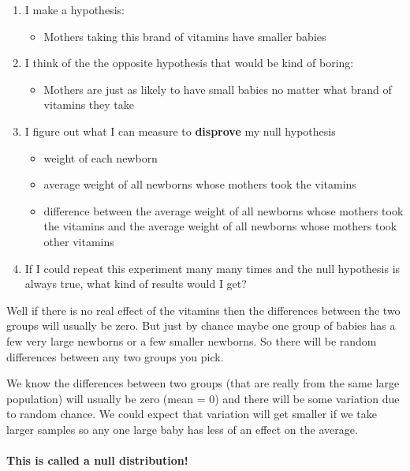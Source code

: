 \documentclass[]{article}
\providecommand{\tightlist}{%
  \setlength{\itemsep}{0pt}\setlength{\parskip}{0pt}}
\let\oldparagraph\paragraph
\renewcommand{\paragraph}[1]{\oldparagraph{#1}\mbox{}}
\begin{document}
\begin{enumerate}
\def\labelenumi{\arabic{enumi}.}
\tightlist
\item
  I make a hypothesis:

  \begin{itemize}
  \tightlist
  \item
    Mothers taking this brand of vitamins have smaller babies
  \end{itemize}
\item
  I think of the the opposite hypothesis that would be kind of boring:

  \begin{itemize}
  \tightlist
  \item
    Mothers are just as likely to have small babies no matter what brand
    of vitamins they take
  \end{itemize}
\item
  I figure out what I can measure to \textbf{disprove} my null
  hypothesis

  \begin{itemize}
  \tightlist
  \item
    weight of each newborn
  \item
    average weight of all newborns whose mothers took the vitamins
  \item
    difference between the average weight of all newborns whose mothers
    took the vitamins and the average weight of all newborns whose
    mothers took other vitamins
  \end{itemize}
\item
  If I could repeat this experiment many many times and the null
  hypothesis is always true, what kind of results would I get?
\end{enumerate}

Well if there is no real effect of the vitamins then the differences
between the two groups will usually be zero. But just by chance maybe
one group of babies has a few very large newborns or a few smaller
newborns. So there will be random differences between any two groups you
pick.

We know the differences between two groups (that are really from the
same large population) will usually be zero (mean = 0) and there will be
some variation due to random chance. We could expect that variation will
get smaller if we take larger samples so any one large baby has less of
an effect on the average.

\paragraph{This is called a null
distribution!}\label{this-is-called-a-null-distribution}
\end{document}
